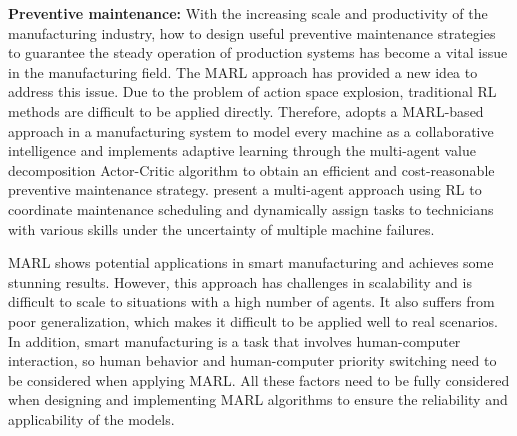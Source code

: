 \documentclass[acmsmall]{acmart}
\begin{document}
\textbf{Preventive maintenance: } With the increasing scale and productivity of the manufacturing industry, how to design useful preventive maintenance strategies to guarantee the steady operation of production systems has become a vital issue in the manufacturing field. The MARL approach has provided a new idea to address this issue. 
Due to the problem of action space explosion, traditional RL methods are difficult to be applied directly. Therefore, \cite{SU2022116323} adopts a MARL-based approach in a manufacturing system to model every machine as a collaborative intelligence and implements adaptive learning through the multi-agent value decomposition Actor-Critic algorithm to obtain an efficient and cost-reasonable preventive maintenance strategy.
\cite{RUIZRODRIGUEZ2022102406} present a multi-agent approach using RL to coordinate maintenance scheduling and dynamically assign tasks to technicians with various skills under the uncertainty of multiple machine failures.
% 

MARL shows potential applications in smart manufacturing and achieves some stunning results. However, this approach has challenges in scalability and is difficult to scale to situations with a high number of agents. It also suffers from poor generalization, which makes it difficult to be applied well to real scenarios. In addition, smart manufacturing is a task that involves human-computer interaction, so human behavior and human-computer priority switching need to be considered when applying MARL. All these factors need to be fully considered when designing and implementing MARL algorithms to ensure the reliability and applicability of the models.
\end{document}
